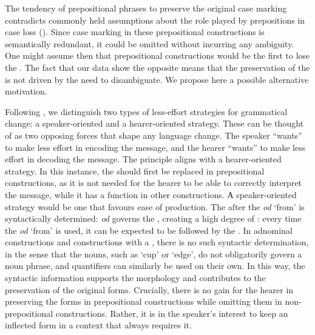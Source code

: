 \documentclass[output=paper,colorlinks,citecolor=brown]{langscibook}
\begin{document}
The tendency of prepositional phrases to preserve the original case marking contradicts commonly held assumptions about the role played by prepositions in case loss (\citealt{blake2004, hewsonbubenik2006}). Since  case marking in these prepositional constructions is semantically redundant, it could be omitted without incurring any ambiguity. One might assume then that prepositional constructions would be the first to lose the . The fact that our data show the opposite means that the preservation of the  is not driven by the need to disambiguate. We propose here a possible alternative motivation.

Following \citet{norde2002}, we distinguish two types of less-effort strategies for grammatical change: a speaker-oriented and a hearer-oriented strategy. These can be thought of as two opposing forces that shape any language change. The speaker ``wants'' to make less effort in encoding the message, and the hearer ``wants'' to make less effort in decoding the message. The  principle aligns with a hearer-oriented strategy. In this instance, the  should first be replaced in prepositional constructions, as it is not needed for the hearer to be able to correctly interpret the message, while it has a function in other constructions. А speaker-oriented strategy would be one that favours ease of production. The   after the  \emph{od} `from' is syntactically determined: \emph{od} governs the , creating a high degree of : every time the  \emph{od} `from' is used, it can be expected to be followed by the . In adnominal constructions and constructions with a , there is no such syntactic determination, in the sense that the nouns, such as `cup' or `edge', do not obligatorily govern a noun phrase, and quantifiers can similarly be used on their own. In this way, the syntactic information supports the  morphology and contributes to the preservation of the original  forms. Crucially, there is no gain for the hearer in preserving the  forms in prepositional constructions while omitting them in non-prepositional constructions. Rather, it is in the speaker's interest to keep an inflected form in a context that always requires it.
\end{document}

